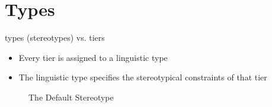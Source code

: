 \documentclass{beamer}
\begin{document}
  \section{Types}
    \begin{frame}{types (stereotypes) vs. tiers}
    \begin{itemize}
      \item Every tier is assigned to a linguistic type
      \item The linguistic type specifies the stereotypical constraints of that tier
    \end{itemize}
    \pause
      \begin{figure}[h!]
      \begin{center}
      \caption{The Default Stereotype}
         \setlength\fboxsep{0pt}
         \setlength\fboxrule{0pt}
      \end{center}
      \end{figure}
    \end{frame}
    
\end{document}

